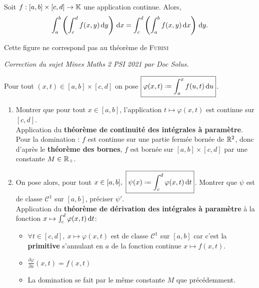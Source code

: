 
\begin{theo}
    Soit $f: [a,b] \times [c, d] \to \mathbb{K}$ une application continue. Alors,
    $$\int_{a}^{b} \left ( \int_{c}^{d} f(x,y) \, \mathrm{d} y \right) \, \mathrm{d} x = \int_{c}^{d} \left ( \int_{a}^{b} f(x,y) \, \mathrm{d} x \right) \, \mathrm{d} y.$$
\end{theo}

\begin{marginfigure}[-6cm]
    \centering
    
    \caption{\centering Cette figure ne correspond pas au théorème de \textsc{Fubini}}
\end{marginfigure}

\textit{Correction du sujet Mines Maths 2 PSI 2021 par Doc Solus.} 
\begin{preuve}
    Pour tout $(x, t) \in [a, b] \times [c, d]$ on pose $\boxed{\varphi(x, t) \defeq \int_{a}^{x} f(u, t) \d u}$. 
    \begin{enumerate}
        \item Montrer que pour tout $x \in [a, b]$, l'application $t \mapsto \varphi(x, t)$ est continue sur $[c, d]$. \\
        Application du \textbf{théorème de continuité des intégrales à paramètre}. \\
        Pour la domination : $f$ est continue sur une partie fermée bornée de $\mathbb{R}^2$, donc d'après le \textbf{théorème des bornes}, $f$ est bornée sur $[a, b] \times [c, d]$ par une constante $M \in \mathbb{R}_+$.
        \item On pose alors, pour tout $x  \in [a, b],\ \boxed{\psi(x) \defeq \int_{c}^{d} \varphi(x, t) \d t}$. Montrer que $\psi$ est de classe $\mathscr{C}^1$ sur $[a, b]$, préciser $\psi'$. \\
        Application du \textbf{théorème de dérivation des intégrales à paramètre} à la fonction $x \mapsto \int_{c}^{d} \varphi(x, t) \, \mathrm{d} t$:
        \begin{itemize}
            \item $\forall t \in [c, d],\ x \mapsto \varphi(x, t)$ est de classe $\mathscr{C}^1$ sur $[a, b]$ car c'est la \textbf{primitive} s'annulant en $a$ de la fonction continue $x \mapsto f(x, t)$. 
            \item $\frac{\partial \varphi}{\partial x}(x, t) = f(x, t)$
            \item La domination se fait par le même constante $M$ que précédemment. 
        \end{itemize}

\end{enumerate}
\end{preuve}
